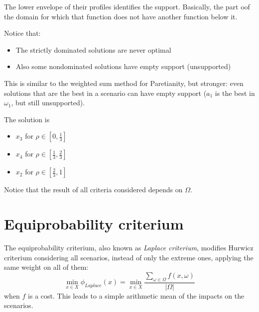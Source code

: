 \begin{center}
\end{center}

The lower envelope of their profiles identifies the support. Basically, the part oof the domain for which that function does not have another function below it.

Notice that: 
\begin{itemize}
	\item The strictly dominated solutions are never optimal 
	
	\item Also some nondominated solutions have empty support (unsupported)
\end{itemize}

This is similar to the weighted sum method for Paretianity, but stronger: even solutions that are the best in a scenario can have empty support ($a_1$ is the best in $\omega_1$, but still unsupported).

The solution is
\begin{itemize}
	\item $x_3$ for $\rho \in \left[0, \frac{1}{3}\right]$
	
	\item $x_4$ for $\rho \in \left[\frac{1}{3}, \frac{2}{3}\right]$
	
	\item $x_2$ for $\rho \in \left[\frac{2}{3}, 1 \right]$
\end{itemize}

Notice that the result of all criteria considered depends on $\Omega$.

\section{Equiprobability criterium}
\label{sec:equiprob}

The equiprobability criterium, also known as \textit{Laplace criterium}, modifies Hurwicz criterium considering all scenarios, instead of only the extreme ones, applying the same weight on all of them:
$$ \min_{x \in X} \phi_{Laplace} (x) = \min_{x \in X} \frac{\sum_{\omega \in \Omega} f(x, \omega)}{|\Omega|} $$
when $f$ is a cost. This leads to a simple arithmetic mean of the impacts on the scenarios.

